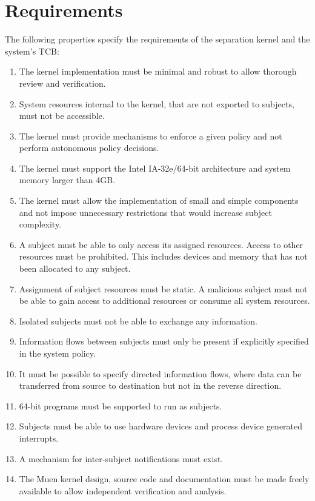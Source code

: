 \section{Requirements}\label{sec:requirements}

The following properties specify the requirements of the separation kernel and
the system's TCB:
\begin{enumerate}
	\item The kernel implementation must be minimal and robust to allow thorough
		review and verification.
	\item System resources internal to the kernel, that are not exported to
		subjects, must not be accessible.
	\item The kernel must provide mechanisms to enforce a given policy and not
		perform autonomous policy decisions.
	\item The kernel must support the Intel IA-32e/64-bit architecture and
		system memory larger than 4GB.
	\item The kernel must allow the implementation of small and simple
		components and not impose unnecessary restrictions that would increase
		subject complexity.
	\item A subject must be able to only access its assigned resources. Access
		to other resources must be prohibited. This includes devices and memory
		that has not been allocated to any subject.
	\item Assignment of subject resources must be static. A malicious subject
		must not be able to gain access to additional resources or consume all
		system resources.
	\item Isolated subjects must not be able to exchange any information.
	\item Information flows between subjects must only be present if explicitly
		specified in the system policy.
	\item It must be possible to specify directed information flows, where data
		can be transferred from source to destination but not in the reverse
		direction.
	\item 64-bit programs must be supported to run as subjects.
	\item Subjects must be able to use hardware devices and process device
		generated interrupts.
	\item A mechanism for inter-subject notifications must exist.
	\item The Muen kernel design, source code and documentation must be made
		freely available to allow independent verification and analysis.
\end{enumerate}
